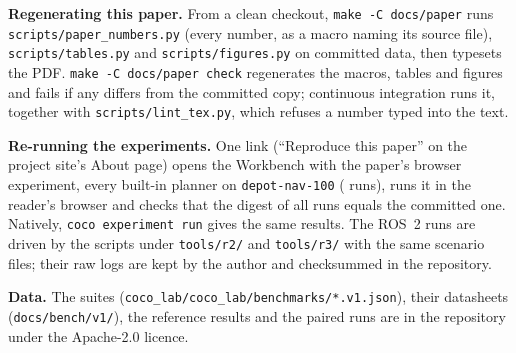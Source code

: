 \textbf{Regenerating this paper.} From a clean checkout, \texttt{make -C docs/paper} runs
\texttt{scripts/paper\_numbers.py} (every number, as a macro naming its source file),
\texttt{scripts/tables.py} and \texttt{scripts/figures.py} on committed data, then typesets the
PDF. \texttt{make -C docs/paper check} regenerates the macros, tables and figures and fails if
any differs from the committed copy; continuous integration runs it, together with
\texttt{scripts/lint\_tex.py}, which refuses a number typed into the text.

\textbf{Re-running the experiments.} One link (``Reproduce this paper'' on the project site's
About page) opens the Workbench with the paper's browser experiment, every built-in planner on
\texttt{depot-nav-100} (\ReproduceRuns{} runs), runs it in the reader's browser and checks that
the digest of all runs equals the committed one. Natively, \texttt{coco experiment run} gives the same
results. The ROS~2 runs are driven by the scripts under \texttt{tools/r2/} and \texttt{tools/r3/}
with the same scenario files; their raw logs are kept by the author and checksummed in the
repository.

\textbf{Data.} The suites (\texttt{coco\_lab/coco\_lab/benchmarks/*.v1.json}), their datasheets
(\texttt{docs/bench/v1/}), the reference results and the paired runs are in the repository under
the Apache-2.0 licence.
